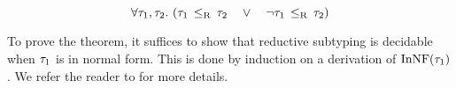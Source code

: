 \begin{theorem}\label{thm:redsub-decidable}
\[
\forall \ty_1, \ty_2.\ 
(\bjsubr{\ty_1}{\ty_2}\quad \lor\quad \lnot \bjsubr{\ty_1}{\ty_2})
\]
\end{theorem}

To prove the theorem, 
it suffices to show that reductive subtyping is decidable
when $\tau_1$ is in normal form.
This is done by induction on a derivation of $\mathop{\mathrm{InNF}}(\tau_1)$.
We refer the reader to  for more details.

